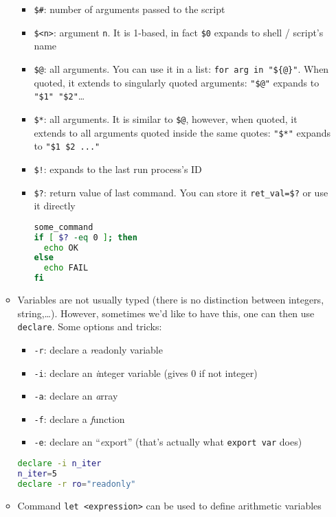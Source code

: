 \documentclass[a4paper,12pt,%
              final%
              ]{article}
\begin{document}
\begin{itemize}
\begin{itemize}
        \begin{itemize}
          \item \verb|$#|: number of arguments passed to the script
          \item \verb|$<n>|: argument \texttt{n}. It is 1-based, in fact \verb|$0| expands to shell / script's name
          \item \verb|$@|: all arguments. You can use it in a list: \verb|for arg in "${@}"|. When quoted, it extends to singularly quoted arguments: \verb|"$@"| expands to \verb|"$1" "$2"|\ldots
          \item \verb|$*|: all arguments. It is similar to \verb|$@|, however, when quoted, it extends to all arguments quoted inside the same quotes: \verb|"$*"| expands to \verb|"$1 $2 ..."|
          \item \verb|$!|: expands to the last run process's ID
          \item \verb|$?|: return value of last command. You can store it \verb|ret_val=$?| or use it directly
\begin{lstlisting}[language=bash]
some_command
if [ $? -eq 0 ]; then
  echo OK
else
  echo FAIL
fi
\end{lstlisting}
        \end{itemize}
      \item Variables are not usually typed (there is no distinction between integers, string,\ldots). However, sometimes we'd like to have this, one can then use \texttt{declare}. Some options and tricks:
        \begin{itemize}
          \item \verb|-r|: declare a \emph{r}eadonly variable
          \item \verb|-i|: declare an \emph{i}nteger variable (gives 0 if not integer)
          \item \verb|-a|: declare an \emph{a}rray
          \item \verb|-f|: declare a \emph{f}unction
          \item \verb|-e|: declare an ``\emph{e}xport'' (that's actually what \texttt{export var} does)
        \end{itemize}
\begin{lstlisting}[language=bash]
declare -i n_iter
n_iter=5
declare -r ro="readonly"
\end{lstlisting}
      \item Command \verb|let <expression>| can be used to define arithmetic variables
\begin{lstlisting}[language=bash]

\end{lstlisting}
\end{itemize}
\end{itemize}
\end{document}
